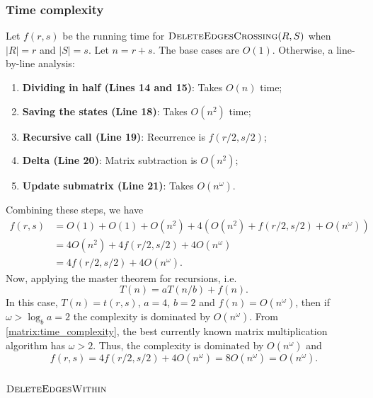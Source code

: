 \subsubsection{Time complexity}
\noindent
Let \(f(r, s)\) be the running time for \(\textsc{DeleteEdgesCrossing}(R, S)\) when \(|R| = r\) and \(|S| = s\).
Let \(n = r + s\). The base cases are \(O(1)\).
Otherwise, a line-by-line analysis:
\begin{enumerate}
    \item \textbf{Dividing in half (Lines 14 and 15)}: Takes \(O(n)\) time;
    \item \textbf{Saving the states (Line 18)}: Takes \(O(n^2)\) time;
    \item \textbf{Recursive call (Line 19)}: Recurrence is \(f(r/2, s/2)\);
    \item \textbf{Delta (Line 20)}: Matrix subtraction is \(O(n^2)\);
    \item \textbf{Update submatrix (Line 21)}: Takes \(O(n^\omega)\).
\end{enumerate}
Combining these steps, we have
\begin{align*}
    f(r, s) &= O(1) + O(1) + O(n^2) + 4(O(n^2) + f(r / 2, s / 2) + O(n^\omega))  \\
    &= 4O(n^2) + 4f(r / 2, s / 2) + 4O(n^\omega) \\
    &= 4f(r / 2, s / 2) + 4O(n^\omega).
\end{align*}
Now, applying the master theorem \cite[Theorem 4.1]{CLRS} for recursions, i.e. 
\[
  T(n) = aT(n/b) + f(n).
\]
In this case, \(T(n) = t(r, s)\), \(a = 4\), \(b = 2\) and \(f(n) = O(n^\omega)\), then if \(\omega > \log_{b}a = 2\) the complexity is dominated by \(O(n^\omega)\).
From \cref{matrix:time_complexity}, the best currently known matrix multiplication algorithm has \(\omega > 2\).
Thus, the complexity is dominated by \(O(n^\omega)\) and
\begin{equation}
  \label{alg:delcrossing}
  f(r, s) = 4f(r/2, s/2) + 4O(n^\omega) = 8O(n^\omega) = O(n^\omega). 
\end{equation}

\subsection{\(\textsc{DeleteEdgesWithin}\)}


